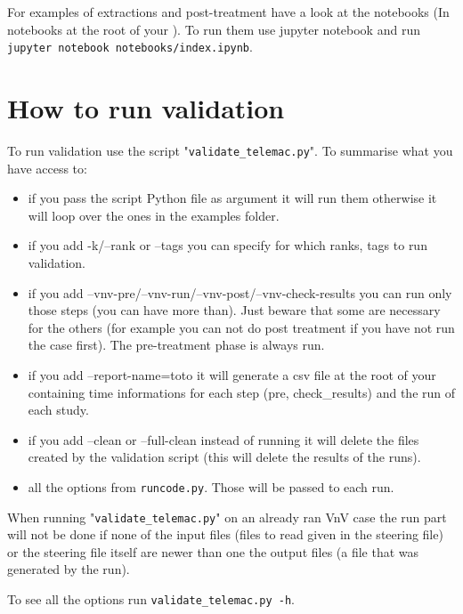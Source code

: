 For examples of extractions and post-treatment have a look at the notebooks (In
notebooks at the root of your \telemacsystem). To run them use jupyter notebook
and run \verb!jupyter notebook notebooks/index.ipynb!.

\section{How to run validation}

To run validation use the script "\verb!validate_telemac.py!".
To summarise what you have access to:
\begin{itemize}
\item if you pass the script Python file as argument it will run them otherwise
  it will loop over the ones in the examples folder.
\item if you add -k/--rank or --tags you can specify for which ranks, tags to
  run validation.
\item if you add --vnv-pre/--vnv-run/--vnv-post/--vnv-check-results you can run
only those steps (you can have more than). Just beware that some are necessary
for the others (for example you can not do post treatment if you have not run
the case first). The pre-treatment phase is always run.
\item if you add --report-name=toto it will generate a csv file at the root of
  your \telemacsystem{} containing time informations for each step (pre,
    check\_results) and the run of each study.
\item if you add --clean or --full-clean instead of running it will delete the
  files created by the validation script (this will delete the results of the
    runs).
\item all the options from \verb!runcode.py!. Those will be passed to each run.
\end{itemize}

When running "\verb!validate_telemac.py!" on an already ran VnV case the run
part will not be done if none of the input files (files to read given in the steering file)
or the steering file itself are newer than one the output files (a file that was
generated by the run).

To see all the options run \verb!validate_telemac.py -h!.

